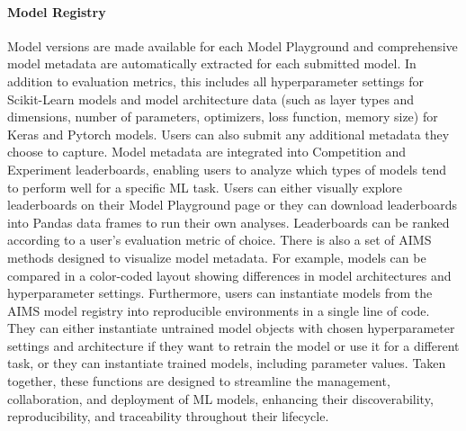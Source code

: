 \paragraph{Model Registry} Model versions are made available for each Model Playground and comprehensive model metadata are automatically extracted for each submitted model. In addition to evaluation metrics, this includes all hyperparameter settings for Scikit-Learn models and model architecture data (such as layer types and dimensions, number of parameters, optimizers, loss function, memory size) for Keras and Pytorch models. Users can also submit any additional metadata they choose to capture. Model metadata are integrated into Competition and Experiment leaderboards, enabling users to analyze which types of models tend to perform well for a specific ML task. Users can either visually explore leaderboards on their Model Playground page or they can download leaderboards into Pandas data frames to run their own analyses. Leaderboards can be ranked according to a user's evaluation metric of choice. There is also a set of AIMS methods designed to visualize model metadata. For example, models can be compared in a color-coded layout showing differences in model architectures and hyperparameter settings. Furthermore, users can instantiate models from the AIMS model registry into reproducible environments in a single line of code. They can either instantiate untrained model objects with chosen hyperparameter settings and architecture if they want to retrain the model or use it for a different task, or they can instantiate trained models, including parameter values. Taken together, these functions are designed to streamline the management, collaboration, and deployment of ML models, enhancing their discoverability, reproducibility, and traceability throughout their lifecycle.

